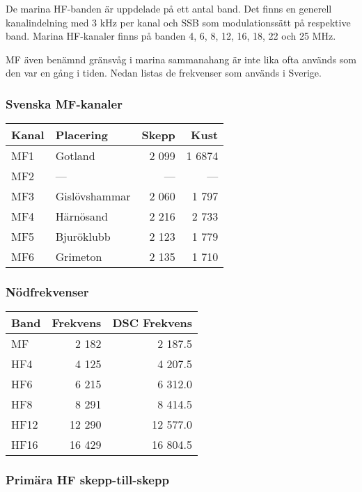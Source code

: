 De marina HF-banden är uppdelade på ett antal band. Det finns en generell kanalindelning med 3 kHz per kanal och SSB som modulationssätt på respektive band. Marina HF-kanaler finns på banden 4, 6, 8, 12, 16, 18, 22 och 25 MHz. 

MF även benämnd gränsvåg i marina sammanahang är inte lika ofta används som den var en gång i tiden. Nedan listas de frekvenser som används i Sverige.

\subsubsection{Svenska MF-kanaler}

\begin{longtable}{llrr}
\textbf{Kanal} & \textbf{Placering} & \textbf{Skepp} & \textbf{Kust}  \\ \hline 
\endhead

MF1 & Gotland       & 2 099 & 1 6874 \\
MF2 & ---           & ---  & ---   \\
MF3 & Gislövshammar & 2 060 & 1 797  \\
MF4 & Härnösand     & 2 216 & 2 733  \\
MF5 & Bjuröklubb    & 2 123 & 1 779  \\
MF6 & Grimeton      & 2 135 & 1 710
\end{longtable}

\subsubsection{Nödfrekvenser}

\begin{longtable}{lrr}
\textbf{Band} & \textbf{Frekvens} & \textbf{DSC Frekvens}\\ \hline \endhead

MF   & 2 182  & 2 187.5  \\
HF4  & 4 125  & 4 207.5  \\
HF6  & 6 215  & 6 312.0  \\
HF8  & 8 291  & 8 414.5  \\
HF12 & 12 290 & 12 577.0 \\
HF16 & 16 429 & 16 804.5 \\
\end{longtable}

\subsubsection{Primära HF skepp-till-skepp}

